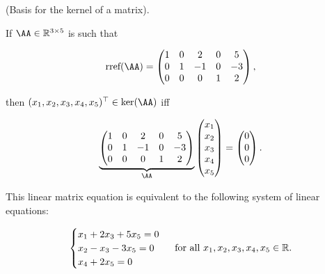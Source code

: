 \begin{example}
    (Basis for the kernel of a matrix).

    If $\AA \in \R^{3 \times 5}$ is such that
    
    \begin{align*}
        \rref(\AA) = 
        \begin{pmatrix}
            1 & 0 & 2 & 0 & 5 \\
            0 & 1 & -1 & 0 & -3 \\
            0 & 0 & 0 & 1 & 2
        \end{pmatrix},
    \end{align*}

     then $(x_1, x_2, x_3, x_4, x_5)^\top \in \ker(\AA)$ iff
     
     \begin{align*}
         \underbrace{
             \begin{pmatrix}
                1 & 0 & 2 & 0 & 5 \\
                0 & 1 & -1 & 0 & -3 \\
                0 & 0 & 0 & 1 & 2
            \end{pmatrix}
         }_{\AA}
         \begin{pmatrix} x_1 \\ x_2 \\ x_3 \\ x_4 \\ x_5 \end{pmatrix}
         =
         \begin{pmatrix}
             0 \\ 0 \\ 0
         \end{pmatrix}.
     \end{align*}

     This linear matrix equation is equivalent to the following system of linear equations:

     \begin{align*}
         \begin{cases}
             x_1 + 2x_3 + 5x_5 = 0 \\
             x_2 - x_3 - 3x_5 = 0 \\ 
             x_4 + 2x_5 = 0 \\
         \end{cases}
         \text{ for all $x_1, x_2, x_3, x_4, x_5 \in \mathbb{R}$}.
     \end{align*}


\end{example}

